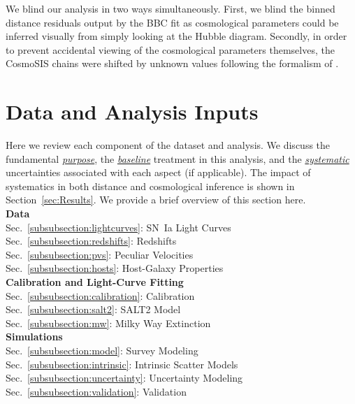 \documentclass[twocolumn]{aastex63}
\begin{document}
We blind our analysis in two ways simultaneously. First, we blind the binned distance residuals output by the BBC fit as cosmological parameters could be inferred visually from simply looking at the Hubble diagram. Secondly, in order to prevent accidental viewing of the cosmological parameters themselves, the CosmoSIS chains were shifted by unknown values {following the formalism of \cite{Hinton16}.}




\section{Data and Analysis Inputs}
\label{sec:Inputs}
Here we review each component of the dataset and analysis. We discuss the fundamental \uline{\textit{purpose}}, the \uline{\textit{baseline}} treatment {in this analysis}, and the \uline{\textit{systematic}} uncertainties associated with each aspect (if applicable). The impact of systematics in both distance and cosmological inference is shown in Section~\ref{sec:Results}.  We provide a brief overview of this section here.\\

\noindent\textbf{Data}\\
Sec.~\ref{subsubsection:lightcurves}: {SN~Ia Light Curves}\\
Sec.~\ref{subsubsection:redshifts}: {{Redshifts}}\\
Sec.~\ref{subsubsection:pvs}: {{Peculiar Velocities}}\\
Sec.~\ref{subsubsection:hosts}: {{Host-Galaxy Properties}}\\

\noindent\textbf{Calibration and Light-Curve Fitting} \\
Sec.~\ref{subsubsection:calibration}: {{Calibration}}\\
Sec.~\ref{subsubsection:salt2}: {{SALT2 Model}}\\
Sec.~\ref{subsubsection:mw}: {{Milky Way Extinction}}\\

\noindent\textbf{Simulations}\\
Sec.~\ref{subsubsection:model}: {{Survey Modeling}}\\
Sec.~\ref{subsubsection:intrinsic}: {{Intrinsic Scatter Models}}\\
Sec.~\ref{subsubsection:uncertainty}: {{Uncertainty Modeling}}\\
Sec.~\ref{subsubsection:validation}: {{Validation}}
\end{document}
